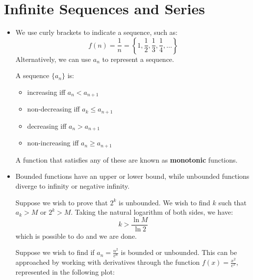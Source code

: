 \section{Infinite Sequences and Series}
\begin{itemize}
    \item We use curly brackets to indicate a sequence, such as:
    \begin{equation}
        f(n) = \frac{1}{n} = \left\{1, \frac{1}{2}, \frac{1}{3}, \frac{1}{4}, \dots\right\}
    \end{equation}
    Alternatively, we can use $a_n$ to represent a sequence.
    \begin{definition}
        A sequence $\{a_n\}$ is:
        \begin{itemize}
            \item increasing iff $a_n < a_{n+1}$
            \item non-decreasing iff $a_k \le a_{n+1}$
            \item decreasing iff $a_n > a_{n+1}$
            \item non-increasing iff $a_n \ge a_{n+1}$
        \end{itemize}
        A function that satisfies any of these are known as \textbf{monotonic} functions.
    \end{definition}
    \item Bounded functions have an upper or lower bound, while unbounded functions diverge to infinity or negative infinity.
    \begin{example}
        Suppose we wish to prove that $2^k$ is unbounded. We wish to find $k$ such that $a_k > M$ or $2^k > M$. Taking the natural logarithm of both sides, we have:
        \begin{equation}
            k > \frac{\ln M}{\ln 2}
        \end{equation}
        which is possible to do and we are done.
    \end{example}
    \begin{example}
        Suppose we wish to find if $a_n = \frac{n^2}{e^n}$ is bounded or unbounded. This can be approached by working with derivatives through the function $f(x) = \frac{x^2}{e^x}$, represented in the following plot:
        \begin{center}
            \begin{tikzpicture}

\end{tikzpicture}
\end{center}
\end{example}
\end{itemize}
